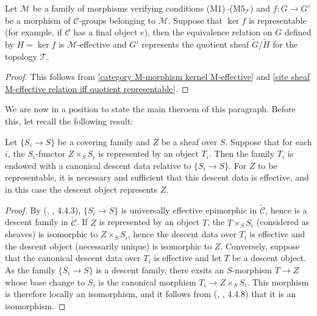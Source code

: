 \begin{corollary}\label{site sheaf M-morphism kernel M-effective}
Let $\mathcal{M}$ be a family of morphisms verifying conditions (M1)--($\text{M5}_\mathcal{T}$) and $f:G\to G'$ be a morphism of $\mathcal{C}$-groups belonging to $\mathcal{M}$. Suppose that $\ker f$ is representable (for example, if $\mathcal{C}$ has a final object $e$), then the equivalence relation on $G$ defined by $H=\ker f$ is $\mathcal{M}$-effective and $G'$ represents the quotient sheaf $\widetilde{G}/\widetilde{H}$ for the topology $\mathcal{T}$.
\end{corollary}
\begin{proof}
This follows from \cref{category M-morphism kernel M-effective} and \cref{site sheaf M-effective relation iff quotient representable}.
\end{proof}

We are now in a position to state the main theroem of this paragraph. Before this, let recall the following result:
\begin{proposition}\label{site sheaf representable iff descent data effective}
Let $\{S_i\to S\}$ be a covering family and $Z$ be a sheaf over $S$. Suppose that for each $i$, the $S_i$-functor $Z\times_SS_i$ is represented by an object $T_i$. Then the family $T_i$ is endowed with a canonical descent data relative to $\{S_i\to S\}$. For $Z$ to be representable, it is necessary and sufficient that this descent data is effective, and in this case the descent object represents $Z$.
\end{proposition}
\begin{proof}
By (\cite{SGA3}, , 4.4.3), $\{S_i\to S\}$ is universally effective epimorphic in $\widetilde{\mathcal{C}}$, hence is a descent family in $\widetilde{\mathcal{C}}$. If $Z$ is represented by an object $T$, the $T\times_SS_i$ (considered as sheaves) is isomorphic to $Z\times_SS_i$, hence the descent data over $T_i$ is effective and the descent object (necessarily unique) is isomorphic to $Z$. Conversely, suppose that the canonical descent data over $T_i$ is effective and let $T$ be a descent object. As the family $\{S_i\to S\}$ is a descent family, there exsits an $S$-morphism $T\to Z$ whose base change to $S_i$ is the canonical morphism $T_i\to Z\times_SS_i$. This morphism is therefore locally an isomorphism, and it follows from (\cite{SGA3}, , 4.4.8) that it is an isomorphism.
\end{proof}

